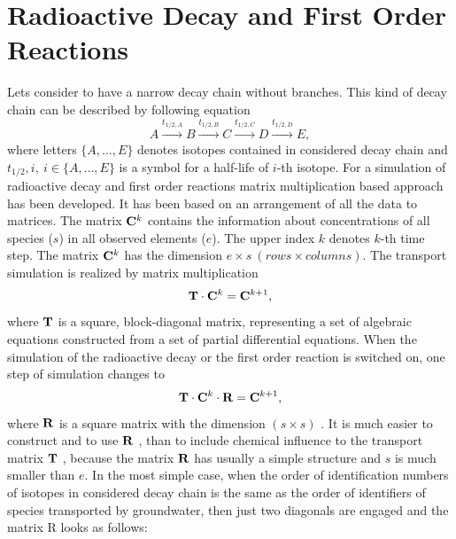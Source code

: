 %
%
%
%

\normalsize

\section{Radioactive Decay and First Order Reactions}
Lets consider to have a narrow decay chain without branches. This kind of decay chain can be described by following equation
\[
 A\xrightarrow{t_{1/2,A}}B\xrightarrow{t_{1/2,B}}C\xrightarrow{t_{1/2,C}}D\xrightarrow{t_{1/2,D}}E,
\]
where letters $\{A,\ldots, E\}$ denotes isotopes contained in considered decay chain and ${t_{1/2},i},~i\in\{A,\ldots, E\}$ is a symbol for a half-life of $i$-th isotope.
For a simulation of radioactive decay and first order reactions matrix multiplication based approach has been developed. It has been based on an arrangement of all the data to matrices. The matrix ${\bf C}^k$ contains the information about concentrations of all species ($s$) in all observed elements ($e$). The upper index $k$ denotes $k$-th time step. The matrix ${\bf C}^k$ has the dimension $e\times s~( rows \times columns)$.
The transport simulation is realized by matrix multiplication 
\[
  {\bf T}\cdot{\bf C}^k = {\bf C}^{k+1},
\]
where ${\bf T}$ is a square, block-diagonal matrix, representing a set of algebraic equations constructed from a set of partial differential equations.
When the simulation of the radioactive decay or the first order reaction is switched on, one step of
simulation changes to 
\[
  {\bf T}\cdot{\bf C}^k\cdot{\bf R} = {\bf C}^{k+1},
\]
where ${\bf R}$ is a square matrix with the dimension $(s \times s)$ . It is much easier to construct and to use ${\bf R}$ , than to include chemical influence to the transport
matrix ${\bf T}$ , because the matrix ${\bf R}$ has usually a simple structure and $s$ is much smaller than $e$. In the most simple case, when the order of identification numbers of isotopes in considered decay chain is the same as the order of identifiers of species transported by groundwater, then just two
diagonals are engaged and the matrix R looks as follows:

